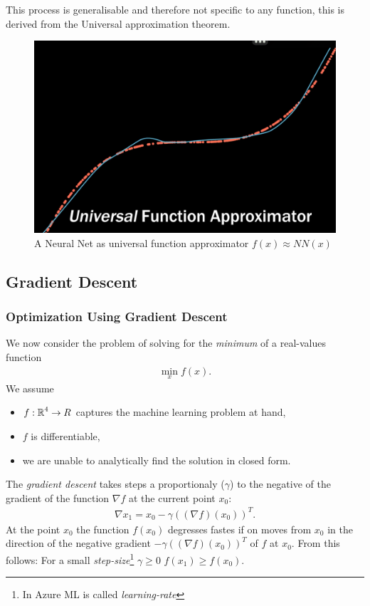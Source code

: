 This process is generalisable and therefore not specific to any function, this is derived from the Universal approximation theorem.
\begin{figure}[H]
	\centering
	\includegraphics[scale = 0.2]{attachment/chapter_AML/Scc034}
	\caption{A Neural Net as universal function approximator $f(x) \approx NN(x)$}
\end{figure}
	


\subsection{Gradient Descent}
\subsubsection{Optimization Using Gradient Descent}
We now consider the problem of solving for the \textit{minimum} of a real-values function
\begin{align}
	\min_{x} f(x).
\end{align}
We assume
\begin{itemize}
	\item $f:\operatorname*{\mathbb{R}}^4 \rightarrow R$ captures the machine learning problem at hand,
	\item $f$ is differentiable,
	\item we are unable to analytically find the solution in closed form.
\end{itemize}
The \textit{gradient descent} takes steps a proportionaly ($\gamma$) to the negative of the gradient of the function $\nabla f$ at the current point $x_0$:
\begin{align}
	\nabla x_1 = x_0 - \gamma ((\nabla f)(x_0))^T.
\end{align}
At the point $x_0$ the function $f(x_0)$ degresses fastes if on moves from $x_0$ in the direction of the negative gradient $- \gamma ((\nabla f)(x_0))^T$ of $f$ at $x_0$. From this follows: For a small \textit{step-size}\footnote{In Azure ML is called \textit{learning-rate}} $\gamma \geq 0$ $f(x_1)\geq f(x_0)$.\\

